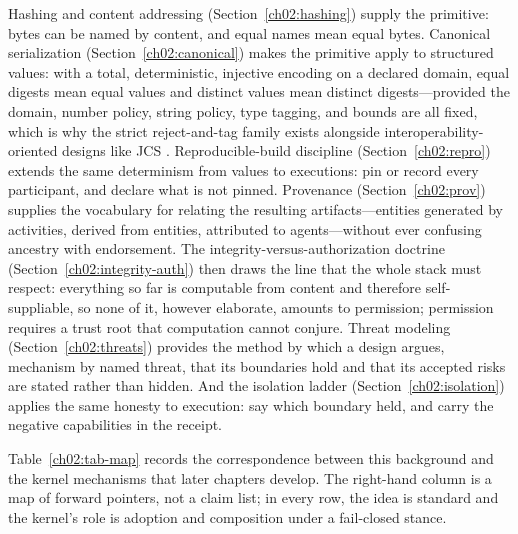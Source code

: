 Hashing and content addressing (Section~\ref{ch02:hashing}) supply
the primitive: bytes can be named by content, and equal names mean
equal bytes. Canonical serialization (Section~\ref{ch02:canonical})
makes the primitive apply to structured values: with a total,
deterministic, injective encoding on a declared domain, equal
digests mean equal values and distinct values mean distinct
digests---provided the domain, number policy, string policy, type
tagging, and bounds are all fixed, which is why the strict
reject-and-tag family exists alongside interoperability-oriented
designs like JCS \cite{jcs}. Reproducible-build discipline
(Section~\ref{ch02:repro}) extends the same determinism from values
to executions: pin or record every participant, and declare what is
not pinned. Provenance (Section~\ref{ch02:prov}) supplies the
vocabulary for relating the resulting artifacts---entities generated
by activities, derived from entities, attributed to agents---without
ever confusing ancestry with endorsement. The
integrity-versus-authorization doctrine
(Section~\ref{ch02:integrity-auth}) then draws the line that the
whole stack must respect: everything so far is computable from
content and therefore self-suppliable, so none of it, however
elaborate, amounts to permission; permission requires a trust root
that computation cannot conjure. Threat modeling
(Section~\ref{ch02:threats}) provides the method by which a design
argues, mechanism by named threat, that its boundaries hold and
that its accepted risks are stated rather than hidden. And the
isolation ladder (Section~\ref{ch02:isolation}) applies the same
honesty to execution: say which boundary held, and carry the
negative capabilities in the receipt.

Table~\ref{ch02:tab-map} records the correspondence between this
background and the kernel mechanisms that later chapters develop.
The right-hand column is a map of forward pointers, not a claim
list; in every row, the idea is standard and the kernel's role is
adoption and composition under a fail-closed stance.


